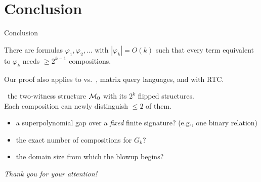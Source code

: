 \section{Conclusion}

\begin{frame}{Conclusion}

\begin{theorem}
There are \FOthree{} formulas $\varphi_1, \varphi_2, \dots$ with $|\varphi_k| = O(k)$
such that every \CoR{} term equivalent to $\varphi_k$ needs $\ge 2^{k-1}$ compositions.
\end{theorem}
Our proof also applies to \FOthree{} vs.\ \FOtwo{}, matrix query languages, and \CoR{} with RTC.

\medskip
{} \ the two-witness structure $\mathcal M_0$ with its $2^k$ flipped structures.\\
Each composition can newly distinguish $\le 2$ of them.

\pause
\vfill
\begin{problem}
\begin{itemize}
  \item a superpolynomial gap over a \emph{fixed} finite signature? (e.g., one binary relation)
  \pause
  \item the exact number of compositions for $G_k$? \ 
  \pause
  \item the domain size from which the blowup begins? \ 
\end{itemize}
\end{problem}

\vfill
\emph{Thank you for your attention!}

\end{frame}
